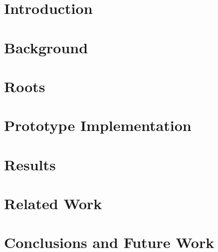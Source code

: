 \section{Introduction}
\label{sec:roots_introduction}


\section{Background}
\label{sec:roots_background}


\section{Roots}
\label{sec:roots_arch}


\section{Prototype Implementation}
\label{sec:roots_impl}


\section{Results}
\label{sec:roots_results}


\section{Related Work}


\section{Conclusions and Future Work}
